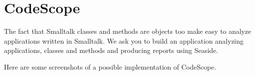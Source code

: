 
\ifx\wholebook\relax\else


\fi

\chapter{CodeScope}
\mainauthor{\ducasse}





The fact that Smalltalk classes and methods are objects too make easy to analyze applications written in Smalltalk. We ask you to build an application analyzing applications, classes and methods and producing reports using Seaside. 

Here are some screenshots of a possible implementation of CodeScope.

